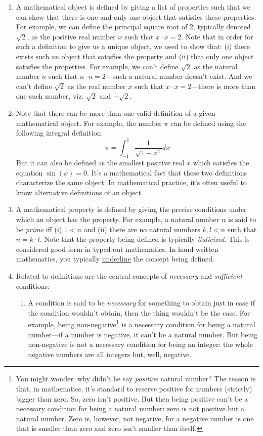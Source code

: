 \begin{enumerate}[{\thesection}.1]
		\item A mathematical object is defined by giving a list of properties such that we can show that there is one and only one object that satisfies these properties. For example, we can define the principal square root of 2, typically denoted $\sqrt{2}$, as the positive real number $x$ such that $x\cdot x=2$. Note that in order for such a definition to give us a unique object, we need to show that: (i) there exists such an object that satisfies the property and (ii) that only one object satisfies the properties. For example, we can't define $\sqrt{2}$ as the natural number $n$ such that $n\cdot n=2$---such a natural number doesn't exist. And we can't define $\sqrt{2}$ as the real number $x$ such that $x\cdot x=2$---there is more than one such number, viz. $\sqrt{2}$ and $-\sqrt{2}$.
		
		\item Note that there can be more than one valid definition of a given mathematical object. For example, the number $\pi$ can be defined using the following integral definition: \[\pi=\int_{-1}^{1}\frac{1}{\sqrt{1-x^2}}dx\] But it can also be defined as the smallest positive real $x$ which satisfies the equation $\sin(x)=0$. It's a mathematical fact that these two definitions characterize the same object. In mathematical practice, it's often useful to know alternative definitions of an object.		
		\item A mathematical property is defined by giving the precise conditions under which an object has the property. For example, a natural number $n$ is said to be \emph{prime} iff (i) $1<n$ and (ii) there are no natural numbers $k,l<n$ such that $n=k\cdot l$. Note that the property being defined is typically \emph{italicized}. This is considered good form in typed-out mathematics. In hand-written mathematics, you typically \underline{underline} the concept being defined.
		
		\item Related to definitions are the central concepts of \emph{necessary} and \emph{sufficient} conditions:
		
			\begin{enumerate}[\thesection.{20}.a]
		
			\item  A condition is said to be \emph{necessary} for something to obtain just in case if the condition wouldn't obtain, then the thing wouldn't be the case. For example, being non-negative\footnote{You might wonder: why didn't he say \emph{positive} natural number? The reason is that, in mathematics, it's standard to reserve positive for numbers (strictly) bigger than zero. So, zero isn't positive. But then being positive can't be a necessary condition for being a natural number: zero is not positive but a natural number. Zero is, however, not negative, for a negative number is one that is smaller than zero and zero isn't smaller than itself.} is a necessary condition for being a natural number---if a number is negative, it can't be a natural number. But being non-negative is not a necessary condition for being an integer: the whole negative numbers are all integers but, well, negative.
						

\end{enumerate}
\end{enumerate}
